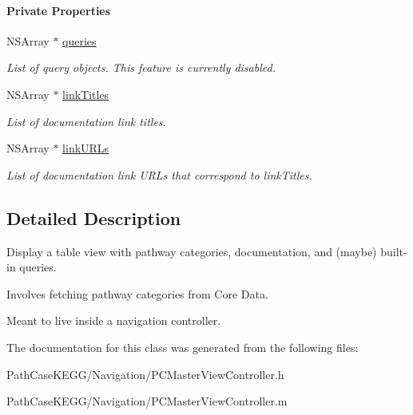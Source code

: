 \begin{Indent}\paragraph*{Private Properties}
\begin{DoxyCompactItemize}
\item 
\hypertarget{interface_p_c_master_view_controller_a17fdef41ec129c034e14e28b546e0e7d}{
NSArray $\ast$ \hyperlink{interface_p_c_master_view_controller_a17fdef41ec129c034e14e28b546e0e7d}{queries}}
\label{interface_p_c_master_view_controller_a17fdef41ec129c034e14e28b546e0e7d}

\begin{DoxyCompactList}\small\item\em List of query objects. This feature is currently disabled. \end{DoxyCompactList}\item 
\hypertarget{interface_p_c_master_view_controller_a18879339e7bb750899ccf95809226353}{
NSArray $\ast$ \hyperlink{interface_p_c_master_view_controller_a18879339e7bb750899ccf95809226353}{linkTitles}}
\label{interface_p_c_master_view_controller_a18879339e7bb750899ccf95809226353}

\begin{DoxyCompactList}\small\item\em List of documentation link titles. \end{DoxyCompactList}\item 
\hypertarget{interface_p_c_master_view_controller_ab264845a5a4ab5ccb3ba0cfde4aa1de7}{
NSArray $\ast$ \hyperlink{interface_p_c_master_view_controller_ab264845a5a4ab5ccb3ba0cfde4aa1de7}{linkURLs}}
\label{interface_p_c_master_view_controller_ab264845a5a4ab5ccb3ba0cfde4aa1de7}

\begin{DoxyCompactList}\small\item\em List of documentation link URLs that correspond to linkTitles. \end{DoxyCompactList}\end{DoxyCompactItemize}
\end{Indent}


\subsection{Detailed Description}
Display a table view with pathway categories, documentation, and (maybe) built-\/in queries. 

Involves fetching pathway categories from Core Data.

Meant to live inside a navigation controller. 

The documentation for this class was generated from the following files:\begin{DoxyCompactItemize}
\item 
PathCaseKEGG/Navigation/PCMasterViewController.h\item 
PathCaseKEGG/Navigation/PCMasterViewController.m\end{DoxyCompactItemize}
